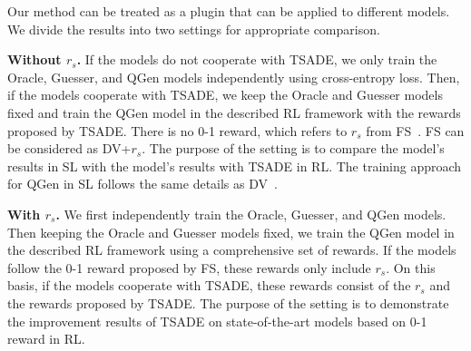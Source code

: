 Our method can be treated as a plugin that can be applied to different models.
We divide the results into two settings for appropriate comparison.

\textbf{Without $r_s$.} If the models do not cooperate with TSADE, we only train the Oracle, Guesser, and QGen models independently using cross-entropy loss.
Then, if the models cooperate with TSADE, we keep the Oracle and Guesser models fixed and train the QGen model in the described RL framework with the rewards proposed by TSADE.
There is no 0-1 reward, which refers to $r_s$ from FS~\cite{strub2017end}.
FS can be considered as DV+$r_s$.
The purpose of the setting is to compare the model's results in SL with the model's results with TSADE in RL.
The training approach for QGen in SL follows the same details as DV~\cite{de2017guesswhat}.  %

\textbf{With $r_s$.} We first independently train the Oracle, Guesser, and QGen models. Then keeping the Oracle and Guesser models fixed, we train the QGen model in the described RL framework using a comprehensive set of rewards. 
If the models follow the 0-1 reward proposed by FS, these rewards only include $r_s$.
On this basis, if the models cooperate with TSADE, these rewards consist of the $r_s$ and the rewards proposed by TSADE.
The purpose of the setting is to demonstrate the improvement results of TSADE on state-of-the-art models based on 0-1 reward in RL.

